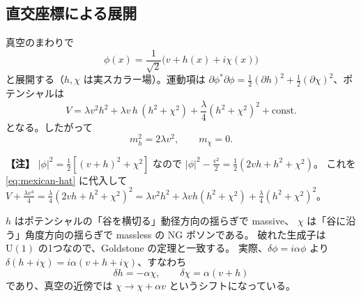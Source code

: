 \documentclass[uplatex,dvipdfmx,a4paper,11pt,openany]{jsbook}
\newenvironment{note}{\vspace{1ex}\par\footnotesize\noindent\textbf{【注】}}{\par\vspace{1ex}}
\numberwithin{equation}{chapter}
\theoremstyle{definition}
\theoremstyle{plain}
\theoremstyle{remark}
\newcommand{\U}{\mathrm{U}}
\begin{document}
\subsection{直交座標による展開}
真空のまわりで
\begin{equation}
\phi(x)=\frac{1}{\sqrt2}\bigl(v+h(x)+i\chi(x)\bigr)
\label{eq:U1-cartesian}
\end{equation}
と展開する（$h,\chi$ は実スカラー場）。運動項は $\partial\phi^*\partial\phi=\frac12(\partial h)^2+\frac12(\partial\chi)^2$、ポテンシャルは
\begin{equation}
V=\lambda v^2h^2+\lambda v\,h\,(h^2+\chi^2)+\frac\lambda4(h^2+\chi^2)^2+\text{const.}
\label{eq:U1-cartesian-V}
\end{equation}
となる。したがって
\begin{equation}
m_h^2=2\lambda v^2,\qquad m_\chi=0 .
\end{equation}
\begin{note}
$|\phi|^2=\frac12\left[(v+h)^2+\chi^2\right]$ なので
$|\phi|^2-\frac{v^2}{2}=\frac12\left(2vh+h^2+\chi^2\right)$。
これを \eqref{eq:mexican-hat} に代入して
$V+\frac{\lambda v^4}{4}=\frac\lambda4(2vh+h^2+\chi^2)^2=\lambda v^2h^2+\lambda vh(h^2+\chi^2)+\frac\lambda4(h^2+\chi^2)^2$。
\end{note}
$h$ はポテンシャルの「谷を横切る」動径方向の揺らぎで massive、
$\chi$ は「谷に沿う」角度方向の揺らぎで massless の NG ボソンである。
破れた生成子は $\U(1)$ の1つなので、Goldstone の定理と一致する。
実際、$\delta\phi=i\alpha\phi$ より $\delta(h+i\chi)=i\alpha(v+h+i\chi)$、すなわち
\begin{equation}
\delta h=-\alpha\chi,\qquad \delta\chi=\alpha(v+h)
\end{equation}
であり、真空の近傍では $\chi\to\chi+\alpha v$ というシフトになっている。
\end{document}
